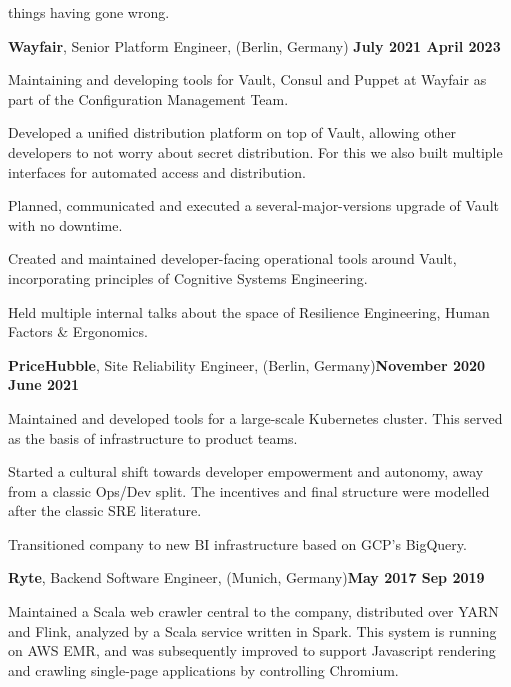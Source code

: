 \documentclass[a4paper]{article}
\renewenvironment{itemize}{
  \begin{list}{}{
      \setlength{\leftmargin}{1em}
      \setlength{\itemsep}{4pt}
  }
}{
\end{list}
}
\newenvironment{positionsList}{
  \begin{itemize}
    \setlength{\itemsep}{20pt}
}{\end{itemize}}
\begin{document}
\begin{positionsList}
\begin{itemize}
    things having gone wrong.
  \end{itemize}
\item {\large \textbf{Wayfair}, Senior Platform Engineer, {\footnotesize(Berlin, Germany)} \hfill \textbf{July 2021 {\textendash} April 2023}}
  \begin{itemize}
  \item Maintaining and developing tools for Vault, Consul and Puppet at
    Wayfair as part of the Configuration Management Team.
  \item Developed a unified distribution platform on top of Vault, allowing
    other developers to not worry about secret distribution. For this we also
    built multiple interfaces for automated access and distribution.
  \item Planned, communicated and executed a several-major-versions upgrade of
    Vault with no downtime.
  \item Created and maintained developer-facing operational tools around Vault,
    incorporating principles of Cognitive Systems Engineering.
  \item Held multiple internal talks about the space of Resilience Engineering,
    Human Factors \& Ergonomics.
  \end{itemize}
\item {\large \textbf{PriceHubble}, Site Reliability Engineer, {\footnotesize(Berlin, Germany)}\hfill \textbf{November 2020 {\textendash} June 2021}}
  \begin{itemize}
    \item Maintained and developed tools for a large-scale Kubernetes
      cluster. This served as the basis of infrastructure to product teams.
    \item Started a cultural shift towards developer empowerment and autonomy,
      away from a classic Ops/Dev split. The incentives and final structure were
      modelled after the classic SRE literature.
    \item Transitioned company to new BI infrastructure based on GCP's
      BigQuery.
  \end{itemize}
\item {\large \textbf{Ryte}, Backend Software Engineer, {\footnotesize(Munich, Germany)}\hfill \textbf{May 2017 {\textendash} Sep 2019}}
   \begin{itemize}
      \item Maintained a Scala web crawler central to the company,
        distributed over YARN and Flink, analyzed by a Scala service
        written in Spark. This system is running on AWS EMR, and was
        subsequently improved to support Javascript rendering and crawling
        single-page applications by controlling Chromium.
  \end{itemize}
\end{positionsList}
\end{document}

